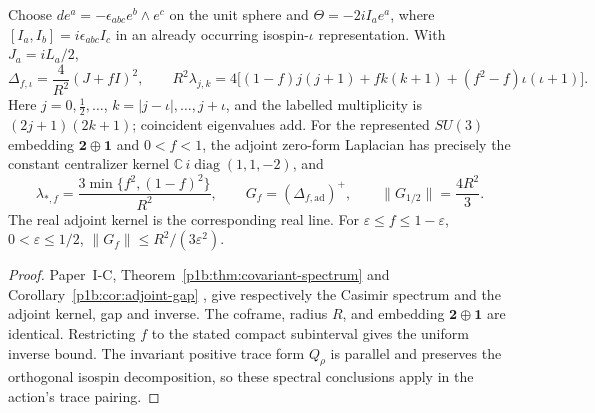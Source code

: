 \documentclass[11pt,a4paper]{article}
\begin{document}
\begin{theorem}
\label{p3f:thm:m8td-covariant-casimir}
Choose $de^a=-\epsilon_{abc}e^b\wedge e^c$ on the unit sphere and
$\Theta=-2iI_ae^a$, where $[I_a,I_b]=i\epsilon_{abc}I_c$ in an
already occurring isospin-$\iota$ representation. With $J_a=iL_a/2$,
\begin{equation}
 \Delta_{f,\iota}=\frac4{R^2}(J+fI)^2,\qquad
 R^2\lambda_{j,k}=4\bigl[(1-f)j(j+1)+fk(k+1)
                      +(f^2-f)\iota(\iota+1)\bigr].
 \label{p3f:eq:m8td-casimir}
\end{equation}
Here $j=0,\tfrac12,\ldots$, $k=|j-\iota|,\ldots,j+\iota$, and the
labelled multiplicity is $(2j+1)(2k+1)$; coincident eigenvalues add.
For the represented $SU(3)$ embedding $\mathbf2\oplus\mathbf1$ and
$0<f<1$, the adjoint zero-form Laplacian has precisely the constant
centralizer kernel $\mathbb C\,i\operatorname{diag}(1,1,-2)$, and
\begin{equation}
 \lambda_{*,f}=\frac{3\min\{f^2,(1-f)^2\}}{R^2},\qquad
 G_f=(\Delta_{f,\mathrm{ad}})^+,\qquad
 \|G_{1/2}\|=\frac{4R^2}{3}.
 \label{p3f:eq:m8td-adjoint-gap}
\end{equation}
The real adjoint kernel is the corresponding real line. For
$\varepsilon\le f\le1-\varepsilon$, $0<\varepsilon\le1/2$,
$\|G_f\|\le R^2/(3\varepsilon^2)$.
\end{theorem}
\begin{proof}
Paper~I-C, Theorem~\ref{p1b:thm:covariant-spectrum} and
Corollary~\ref{p1b:cor:adjoint-gap} \cite{Kugelmann2026Paper1C}, give
respectively the Casimir spectrum and the adjoint kernel, gap and inverse.
The coframe, radius \(R\), and embedding \(\mathbf2\oplus\mathbf1\)
are identical. Restricting \(f\) to the stated compact subinterval gives
the uniform inverse bound. The invariant positive trace form \(Q_\rho\)
is parallel and preserves the orthogonal isospin decomposition, so these
spectral conclusions apply in the action's trace pairing.
\end{proof}
\end{document}

